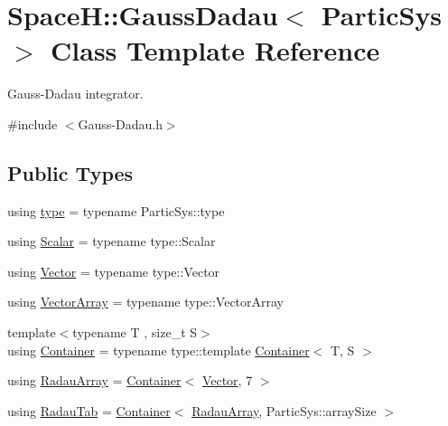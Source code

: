 \hypertarget{class_space_h_1_1_gauss_dadau}{}\section{SpaceH\+:\+:Gauss\+Dadau$<$ Partic\+Sys $>$ Class Template Reference}
\label{class_space_h_1_1_gauss_dadau}


Gauss-\/\+Dadau integrator.  




{\ttfamily \#include $<$Gauss-\/\+Dadau.\+h$>$}

\subsection*{Public Types}
\begin{DoxyCompactItemize}
\item 
using \mbox{\hyperlink{class_space_h_1_1_gauss_dadau_a780629d19a82feeab959cd68c8a5f8a3}{type}} = typename Partic\+Sys\+::type
\item 
using \mbox{\hyperlink{class_space_h_1_1_gauss_dadau_ace42540e9fb47d7f1d1f00622bbd1ccb}{Scalar}} = typename type\+::\+Scalar
\item 
using \mbox{\hyperlink{class_space_h_1_1_gauss_dadau_a2019bc4c1ee812f59a32f9273c84f5be}{Vector}} = typename type\+::\+Vector
\item 
using \mbox{\hyperlink{class_space_h_1_1_gauss_dadau_a69e00c49f96f4ffeeb767bb7222834da}{Vector\+Array}} = typename type\+::\+Vector\+Array
\item 
{\footnotesize template$<$typename T , size\+\_\+t S$>$ }\\using \mbox{\hyperlink{class_space_h_1_1_gauss_dadau_adccd45f5653523a6ae7bb0da0c244b5d}{Container}} = typename type\+::template \mbox{\hyperlink{class_space_h_1_1_gauss_dadau_adccd45f5653523a6ae7bb0da0c244b5d}{Container}}$<$ T, S $>$
\item 
using \mbox{\hyperlink{class_space_h_1_1_gauss_dadau_abe198802fcc0899c1f4d472ac989b845}{Radau\+Array}} = \mbox{\hyperlink{class_space_h_1_1_gauss_dadau_adccd45f5653523a6ae7bb0da0c244b5d}{Container}}$<$ \mbox{\hyperlink{class_space_h_1_1_gauss_dadau_a2019bc4c1ee812f59a32f9273c84f5be}{Vector}}, 7 $>$
\item 
using \mbox{\hyperlink{class_space_h_1_1_gauss_dadau_aa191c67a1447ce70b7ec2dae6b061176}{Radau\+Tab}} = \mbox{\hyperlink{class_space_h_1_1_gauss_dadau_adccd45f5653523a6ae7bb0da0c244b5d}{Container}}$<$ \mbox{\hyperlink{class_space_h_1_1_gauss_dadau_abe198802fcc0899c1f4d472ac989b845}{Radau\+Array}}, Partic\+Sys\+::array\+Size $>$
\end{DoxyCompactItemize}
